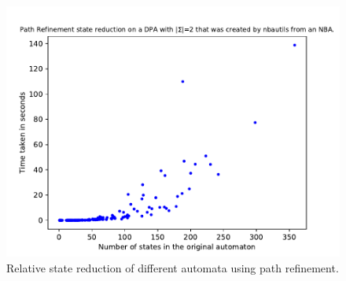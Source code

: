 \begin{figure}
\begin{minipage}{0.49\textwidth}
		\includegraphics[page=5,height=.3\textheight]{../data/analysis/path_refinement/detnbaut_ap1.pdf} 
		\caption{Relative state reduction of different automata using path refinement.}
		\label{exp:fig:path_refinement_reduct_prios}
	\end{minipage}
\end{figure}

